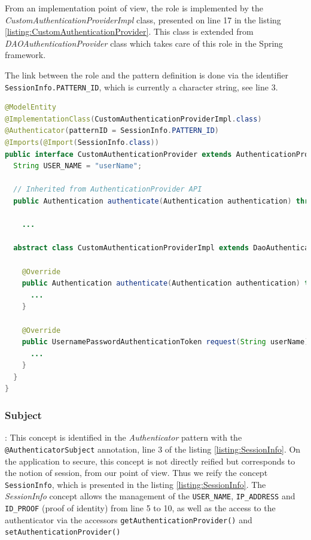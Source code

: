 From an implementation point of view, the role is implemented by the \textit{CustomAuthenticationProviderImpl} class, presented on line 17 in the listing \ref{listing:CustomAuthenticationProvider}.
This class is extended from \textit{DAOAuthenticationProvider} class which takes care of this role in the Spring framework. 

The link between the role and the pattern definition is done via the identifier \texttt{SessionInfo.PATTERN_ID}, which is currently a character string, see line 3.


\begin{lstlisting}[language=Java,basicstyle=\ttfamily\footnotesize, caption=Specialization of \textit{Authenticator} entity through \texttt{CustomAuthenticationProvider} definition,label=listing:CustomAuthenticationProvider]
@ModelEntity
@ImplementationClass(CustomAuthenticationProviderImpl.class)
@Authenticator(patternID = SessionInfo.PATTERN_ID)
@Imports(@Import(SessionInfo.class))
public interface CustomAuthenticationProvider extends AuthenticationProvider {
  String USER_NAME = "userName";

  // Inherited from AuthenticationProvider API
  public Authentication authenticate(Authentication authentication) throws AuthenticationException;
    
    ...
    
  abstract class CustomAuthenticationProviderImpl extends DaoAuthenticationProvider implements CustomAuthenticationProvider {

    @Override
    public Authentication authenticate(Authentication authentication) throws AuthenticationException {
      ...
    }

    @Override
    public UsernamePasswordAuthenticationToken request(String userName) {
      ...
    }
  }
}
\end{lstlisting}

\subsubsection{Subject}: 
This concept is identified in the \textit{Authenticator} pattern with the \texttt{@AuthenticatorSubject} annotation, line 3 of the listing \ref{listing:SessionInfo}. On the application to secure, this concept is not directly reified but corresponds to the notion of session, from our point of view. Thus we reify the concept \texttt{SessionInfo}, which is presented in the listing \ref{listing:SessionInfo}. 
The \textit{SessionInfo} concept allows the management of the \texttt{USER_NAME}, \texttt{IP\_ADDRESS} and \texttt{ID\_PROOF} (proof of identity) from line 5 to 10, as well as the access to the authenticator via the accessors \texttt{getAuthenticationProvider()} and \texttt{setAuthenticationProvider()}

